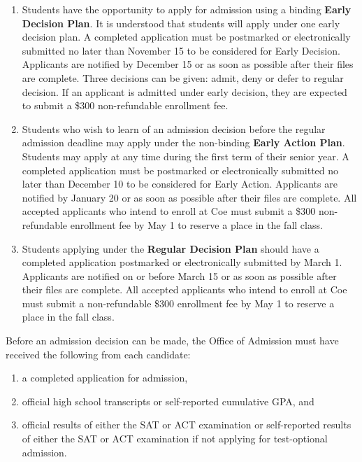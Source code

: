 \documentclass[
  letterpaper,
]{scrbook}
\providecommand{\tightlist}{%
  \setlength{\itemsep}{0pt}\setlength{\parskip}{0pt}}
\begin{document}
\begin{enumerate}
\def\labelenumi{\arabic{enumi}.}
\tightlist
\item
  Students have the opportunity to apply for admission using a binding
  \textbf{Early Decision Plan}. It is understood that students will
  apply under one early decision plan. A completed application must be
  postmarked or electronically submitted no later than November 15 to be
  considered for Early Decision. Applicants are notified by December 15
  or as soon as possible after their files are complete. Three decisions
  can be given: admit, deny or defer to regular decision. If an
  applicant is admitted under early decision, they are expected to
  submit a \$300 non-refundable enrollment fee.\\
\item
  Students who wish to learn of an admission decision before the regular
  admission deadline may apply under the non-binding \textbf{Early
  Action Plan}. Students may apply at any time during the first term of
  their senior year. A completed application must be postmarked or
  electronically submitted no later than December 10 to be considered
  for Early Action. Applicants are notified by January 20 or as soon as
  possible after their files are complete. All accepted applicants who
  intend to enroll at Coe must submit a \$300 non-refundable enrollment
  fee by May 1 to reserve a place in the fall class.
\item
  Students applying under the \textbf{Regular Decision Plan} should have
  a completed application postmarked or electronically submitted by
  March 1. Applicants are notified on or before March 15 or as soon as
  possible after their files are complete. All accepted applicants who
  intend to enroll at Coe must submit a non-refundable \$300 enrollment
  fee by May 1 to reserve a place in the fall class.
\end{enumerate}

Before an admission decision can be made, the Office of Admission must
have received the following from each candidate:

\begin{enumerate}
\def\labelenumi{\arabic{enumi}.}
\tightlist
\item
  a completed application for admission,
\item
  official high school transcripts or self-reported cumulative GPA, and
\item
  official results of either the SAT or ACT examination or self-reported
  results of either the SAT or ACT examination if not applying for
  test-optional admission.
\end{enumerate}
\end{document}
